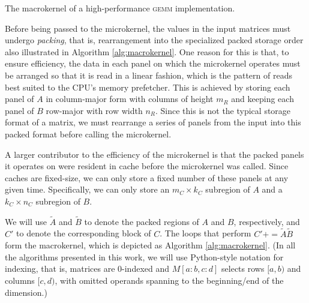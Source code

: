 \documentclass[12pt]{article}
\newcommand*{\TO}{\textbf{to}}
\newcommand*{\pluseq}{\mathrel{{+}{=}}}
\newcommand*{\gemm}{{\textsc{gemm}}}
\begin{document}
\begin{algorithm}
  \caption{The macrokernel of a high-performance \gemm{} implementation.}
  \label{alg:macrokernel}
  \begin{tikzpicture}
    
  \end{tikzpicture}
  \begin{algorithmic}
    \For{$j \gets 0, n_R, \ldots$ \TO{} $n_C$}
    \For{$i \gets 0, m_R, \ldots$ \TO{} $m_C$}
    \State{$C'[i:i + m_R, j:j + n_R] \pluseq \widetilde{A}[i:i+m_R,:] \cdot \widetilde{B}[:,j:j+n_R]$}
    \EndFor{}
    \EndFor{}
    \EndProcedure{}
  \end{algorithmic}
\end{algorithm}

Before being passed to the microkernel, the values in the input matrices must undergo \emph{packing}, that is, rearrangement into the specialized packed storage order also illustrated in Algorithm \ref{alg:macrokernel}.
One reason for this is that, to ensure efficiency, the data in each panel on which the microkernel operates must be arranged so that it is read in a linear fashion, which is the pattern of reads best suited to the CPU's memory prefetcher.
This is achieved by storing each panel of $A$ in column-major form with columns of height $m_R$ and keeping each panel of $B$ row-major with row width $n_R$.
Since this is not the typical storage format of a matrix, we must rearrange a series of panels from the input into this packed format before calling the microkernel.

A larger contributor to the efficiency of the microkernel is that the packed panels it operates on were resident in cache before the microkernel was called.
Since caches are fixed-size, we can only store a fixed number of these panels at any given time.
Specifically, we can only store an $m_C \times k_C$ subregion of $A$ and a $k_C \times n_C$ subregion of $B$.

We will use $\widetilde{A}$ and $\widetilde{B}$ to denote the packed regions of $A$ and $B$, respectively, and $C'$ to denote the corresponding block of $C$.
The loops that perform $C' \pluseq \widetilde{A}\widetilde{B}$ form the macrokernel, which is depicted as Algorithm \ref{alg:macrokernel}.
(In all the algorithms presented in this work, we will use Python-style notation for indexing, that is, matrices are 0-indexed and   $M[a:b, c:d]$ selects rows $[a, b)$ and columns $[c, d)$, with omitted operands spanning to the beginning/end of the dimension.)
\end{document}
